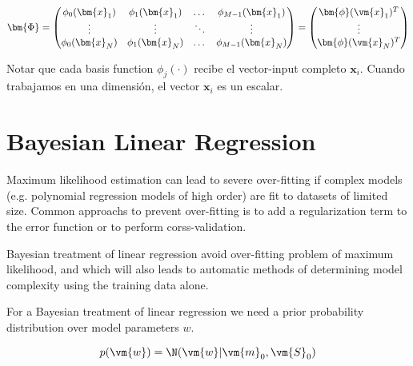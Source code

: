\documentclass[a4paper,10pt]{article}
\begin{document}
\begin{equation}
 \bm{\Phi} =
  \begin{pmatrix}
    \phi_0(\bm{x}_1) & \phi_1(\bm{x}_1) & \dots & \phi_{M-1}(\bm{x}_1)\\
    \vdots & \vdots & \ddots & \vdots \\
    \phi_0(\bm{x}_N) & \phi_1(\bm{x}_N) & \dots & \phi_{M-1}(\bm{x}_N)
  \end{pmatrix}
  = 
  \begin{pmatrix}
   \bm{\phi}(\vm{x}_1)^T \\
   \vdots \\
   \bm{\phi}(\vm{x}_N)^T \\
  \end{pmatrix}
\end{equation}

Notar que cada basis function $\phi_j(\cdot)$ recibe el vector-input completo $\bm{x}_i$.
Cuando trabajamos en una dimensi\'on, el vector $\bm{x}_i$ es un escalar.



% 





\section{Bayesian Linear Regression}


Maximum likelihood estimation can lead to severe over-fitting if complex models (e.g. polynomial regression models of high order) are fit to datasets of limited size.
Common approachs to prevent over-fitting is to add a regularization term to the error function or to perform corss-validation.

\begin{framed}
Bayesian treatment of linear regression avoid over-fitting problem of maximum likelihood, and which will also leads to automatic methods of determining model complexity using the training data alone.
\end{framed}

For a Bayesian treatment of linear regression we need a prior probability distribution over model parameters $w$.

\begin{equation}
 p(\vm{w}) = \N(\vm{w}|\vm{m}_0, \vm{S}_0)
\end{equation}
\end{document}
